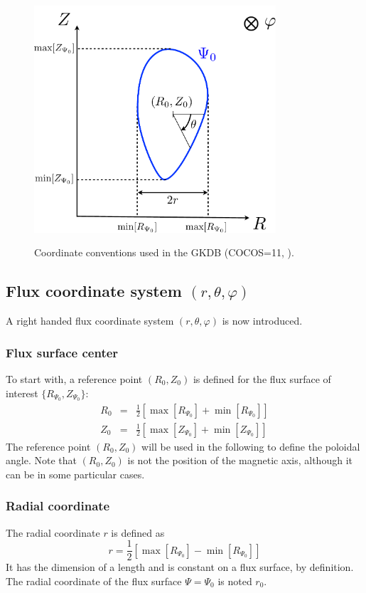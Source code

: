 \documentclass[a4paper]{report}
\begin{document}
\begin{figure}[h]
\begin{center}
  \includegraphics[width=9cm]{COCOS.pdf}\\
  \caption{\label{fig:coord1} Coordinate conventions used in the GKDB (COCOS=11, \cite{Sauter:CPC2013}).}
\end{center}
\end{figure}

\subsection{Flux coordinate system $(r,\theta,\varphi)$}
A right handed flux coordinate system $(r,\theta,\varphi)$ is now introduced.
\subsubsection{Flux surface center}
To start with, a reference point $(R_0,Z_0)$ is defined for the flux surface of interest $\{R_{\Psi_0},Z_{\Psi_0}\}$:
\begin{eqnarray}
 R_0 &=& \frac{1}{2}\left[\max[R_{\Psi_0}] + \min[R_{\Psi_0}]\right]\\
 Z_0 &=& \frac{1}{2}\left[\max[Z_{\Psi_0}] + \min[Z_{\Psi_0}]\right]
\end{eqnarray} 
The reference point  $(R_0,Z_0)$ will be used in the following to define the poloidal angle. Note that $(R_0,Z_0)$ is not the position of the magnetic axis, although it can be in some particular cases. 

\subsubsection{Radial coordinate}
The radial coordinate $r$ is defined as 
\begin{equation}
 r = \frac{1}{2}\left[\max[R_{\Psi_0}] - \min[R_{\Psi_0}]\right]
\end{equation}
It has the dimension of a length and is constant on a flux surface, by definition. The radial coordinate of the flux surface $\Psi=\Psi_0$ is noted $r_0$.
\end{document}
